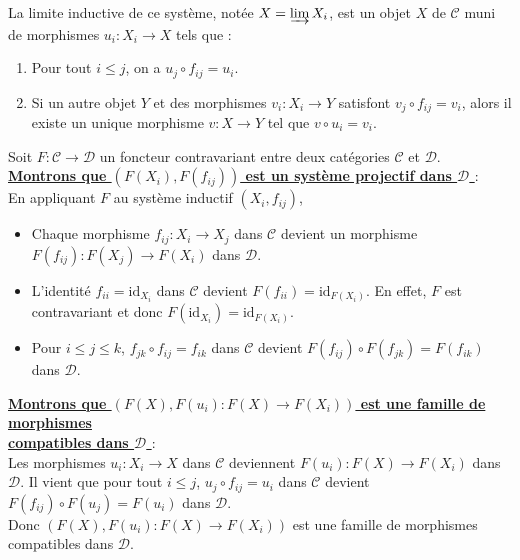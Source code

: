 \documentclass[a4paper, 14pt]{report}
\begin{document}
\begin{onehalfspace}
{			La limite inductive de ce syst\`eme, not\'ee \( X = \varinjlim X_i \), est un objet $X$ de  \( \mathcal{C} \) muni de morphismes \( u_i: X_i \to X \) tels que :
			\begin{enumerate}
				\item Pour tout \( i \leq j \), on a \( u_j \circ f_{ij} = u_i \).
				\item Si un autre objet \( Y \) et des morphismes \( v_i: X_i \to Y \) satisfont \( v_j \circ f_{ij} = v_i \), alors il existe un unique morphisme \( v: X \to Y \) tel que \( v \circ u_i = v_i \).
			\end{enumerate}
			
			Soit \( F: \mathcal{C} \to \mathcal{D} \) un foncteur contravariant entre deux cat\'egories \( \mathcal{C} \) et \( \mathcal{D} \). \\
			
			\textbf{\underline{Montrons que \( (F(X_i), F(f_{ij}) ) \) est un système projectif dans \( \mathcal{D} \) }}: \\
			
			En appliquant \( F \) au système inductif \( (X_i, f_{ij}) \),  
			\begin{itemize}
				\item Chaque morphisme \( f_{ij}: X_i \to X_j \) dans \( \mathcal{C} \) devient un morphisme \\
				\( F(f_{ij}): F(X_j) \to F(X_i) \) dans \( \mathcal{D} \).
				\item L'identité \( f_{ii} = \text{id}_{X_i} \) dans \( \mathcal{C} \) devient \( F(f_{ii}) = \text{id}_{F(X_i)} \). En effet, \( F \) est contravariant et donc \( F(\text{id}_{X_i}) = \text{id}_{F(X_i)} \).
				\item Pour \( i \leq j \leq k \), \( f_{jk} \circ f_{ij} = f_{ik} \) dans \( \mathcal{C} \) devient \( F(f_{ij}) \circ F(f_{jk}) = F(f_{ik}) \) dans \( \mathcal{D} \).
			\end{itemize}
			
			\textbf{\underline{Montrons que \( (F(X), F(u_{i}) : F(X) \to F(X_i) ) \) est une famille de morphismes }} \\
			
			\textbf{\underline{compatibles dans \( \mathcal{D} \) }}: \\
			
Les morphismes \( u_i: X_i \to X \) dans \( \mathcal{C} \) deviennent  \( F(u_i) : F(X) \to F(X_i) \) dans \( \mathcal{D} \). Il vient que pour tout \( i \leq j \), \( u_j \circ f_{ij} = u_i \) dans \( \mathcal{C} \) devient \( F(f_{ij}) \circ F(u_j) = F(u_i) \) dans \( \mathcal{D} \).\\
Donc \( (F(X), F(u_{i}) : F(X) \to F(X_i) ) \) est une famille de morphismes compatibles dans \( \mathcal{D} \). \\
			
}
\end{onehalfspace}
\end{document}
